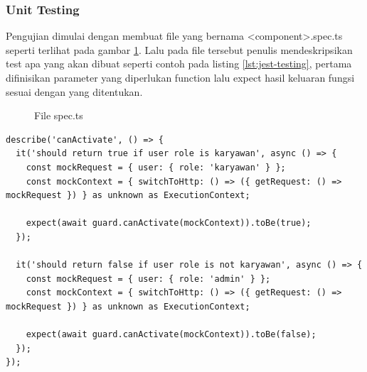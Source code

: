 \subsubsection{Unit Testing}
Pengujian dimulai dengan membuat file yang bernama <component>.spec.ts seperti terlihat pada gambar \ref{ut1}. Lalu pada file tersebut penulis mendeskripsikan test apa yang akan dibuat seperti contoh pada listing \ref{lst:jest-testing}, pertama difinisikan parameter yang diperlukan function lalu expect hasil keluaran fungsi sesuai dengan yang ditentukan.
\begin{figure}[h]
	{\par}
	\caption{File spec.ts}
	\label{ut1}
\end{figure}

\begin{lstlisting}[caption={Contoh Testing Menggunakan Jest},label={lst:jest-testing}]
  describe('canActivate', () => {
  it('should return true if user role is karyawan', async () => {
    const mockRequest = { user: { role: 'karyawan' } };
    const mockContext = { switchToHttp: () => ({ getRequest: () => mockRequest }) } as unknown as ExecutionContext;

    expect(await guard.canActivate(mockContext)).toBe(true);
  });

  it('should return false if user role is not karyawan', async () => {
    const mockRequest = { user: { role: 'admin' } };
    const mockContext = { switchToHttp: () => ({ getRequest: () => mockRequest }) } as unknown as ExecutionContext;

    expect(await guard.canActivate(mockContext)).toBe(false);
  });
});
\end{lstlisting}

